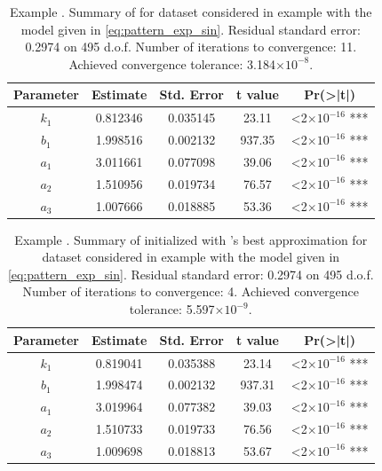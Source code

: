 \begin{table}[htb]
\centering
\begin{tabular}{ccccc}
\toprule
Parameter &  Estimate & Std. Error & t value & Pr(>|t|)\\    
\midrule     
$k_1$ & 0.812346  & 0.035145 &  23.11  & <2$\times 10^{-16}$ ***\\
$b_1$ & 1.998516 &  0.002132 & 937.35 & <2$\times 10^{-16}$ ***\\
$a_1$ & 3.011661 &  0.077098 &  39.06 &  <2$\times 10^{-16}$ ***\\
$a_2$ & 1.510956 &  0.019734 &  76.57  & <2$\times 10^{-16}$ ***\\
$a_3$ & 1.007666  & 0.018885 &  53.36 &  <2$\times 10^{-16}$ ***\\
\bottomrule
\end{tabular} 
\caption{Example . Summary of  for dataset considered in example  with the model given in \eqref{eq:pattern_exp_sin}. Residual standard error: 0.2974 on 495 d.o.f. Number of iterations to convergence: 11. Achieved convergence tolerance:  3.184$\times 10^{-8}$.}
\label{t:one_exponential_one_sinusodial_summary_TAC}
\end{table}








 


\begin{table}[htb]
\centering
\begin{tabular}{ccccc}
\toprule
Parameter &  Estimate & Std. Error & t value & Pr(>|t|)\\    
\midrule   
$k_1$ & 0.819041 &  0.035388 &  23.14  & <2$\times 10^{-16}$ ***\\
$b_1$ & 1.998474 &  0.002132 & 937.31  & <2$\times 10^{-16}$ ***\\
$a_1$ & 3.019964 &  0.077382  & 39.03 &  <2$\times 10^{-16}$ ***\\
$a_2$ & 1.510733 &  0.019733  & 76.56 &  <2$\times 10^{-16}$ ***\\
$a_3$ & 1.009698 &  0.018813 &  53.67 &  <2$\times 10^{-16}$ ***\\
\bottomrule
\end{tabular} 
\caption{Example . Summary of  initialized with 's best approximation for dataset considered in example  with the model given in \eqref{eq:pattern_exp_sin}. Residual standard error: 0.2974 on 495 d.o.f. Number of iterations to convergence: 4. Achieved convergence tolerance:  5.597$\times 10^{-9}$.}
\label{t:one_exponential_one_sinusodial_summary_NLS_best_approximation}
\end{table}



